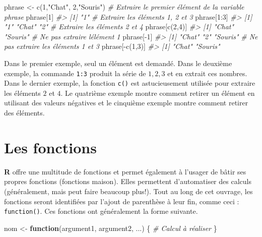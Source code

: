 \documentclass[
]{book}
\newenvironment{Shaded}{}{}
\newcommand{\CommentTok}[1]{\textit{#1}}
\newcommand{\ControlFlowTok}[1]{\textbf{#1}}
\newcommand{\DecValTok}[1]{#1}
\newcommand{\FunctionTok}[1]{#1}
\newcommand{\NormalTok}[1]{#1}
\newcommand{\OtherTok}[1]{#1}
\newcommand{\SpecialCharTok}[1]{#1}
\newcommand{\StringTok}[1]{#1}
\begin{document}
\begin{Shaded}
\begin{Highlighting}[]
\NormalTok{phrase }\OtherTok{\textless{}{-}} \FunctionTok{c}\NormalTok{(}\DecValTok{1}\NormalTok{,}\StringTok{"Chat"}\NormalTok{, }\DecValTok{2}\NormalTok{,}\StringTok{"Souris"}\NormalTok{)}
\CommentTok{\# Extraire le premier élément de la variable phrase}
\NormalTok{phrase[}\DecValTok{1}\NormalTok{]}
\CommentTok{\#\textgreater{} [1] "1"}
\CommentTok{\# Extraire les éléments 1, 2 et 3}
\NormalTok{phrase[}\DecValTok{1}\SpecialCharTok{:}\DecValTok{3}\NormalTok{]}
\CommentTok{\#\textgreater{} [1] "1"    "Chat" "2"}
\CommentTok{\# Extraire les éléments 2 et 4}
\NormalTok{phrase[}\FunctionTok{c}\NormalTok{(}\DecValTok{2}\NormalTok{,}\DecValTok{4}\NormalTok{)]}
\CommentTok{\#\textgreater{} [1] "Chat"   "Souris"}
\CommentTok{\# Ne pas extraire l\textquotesingle{}élément 1}
\NormalTok{phrase[}\SpecialCharTok{{-}}\DecValTok{1}\NormalTok{]}
\CommentTok{\#\textgreater{} [1] "Chat"   "2"      "Souris"}
\CommentTok{\# Ne pas extraire les éléments 1 et 3}
\NormalTok{phrase[}\SpecialCharTok{{-}}\FunctionTok{c}\NormalTok{(}\DecValTok{1}\NormalTok{,}\DecValTok{3}\NormalTok{)]}
\CommentTok{\#\textgreater{} [1] "Chat"   "Souris"}
\end{Highlighting}
\end{Shaded}

Dans le premier exemple, seul un élément est demandé. Dans le deuxième exemple, la commande \texttt{1:3} produit la série de \(1,2,3\) et en extrait ces nombres. Dans le dernier exemple, la fonction \texttt{c()} est astucieusement utilisée pour extraire les éléments \(2\) et \(4\). Le quatrième exemple montre comment retirer un élément en utilisant des valeurs négatives et le cinquième exemple montre comment retirer des éléments.

\hypertarget{les-fonctions}{%
\section{Les fonctions}\label{les-fonctions}}

\textbf{R} offre une multitude de fonctions et permet également à l'usager de bâtir ses propres fonctions (fonctions maison). Elles permettent d'automatiser des calculs (généralement, mais peut faire beaucoup plus!). Tout au long de cet ouvrage, les fonctions seront identifiées par l'ajout de parenthèse à leur fin, comme ceci : \texttt{function()}. Ces fonctions ont généralement la forme suivante.

\begin{Shaded}
\begin{Highlighting}[]
\NormalTok{nom }\OtherTok{\textless{}{-}} \ControlFlowTok{function}\NormalTok{(argument1, argument2, ...) \{}
  \CommentTok{\# Calcul à réaliser}
\NormalTok{\}}
\end{Highlighting}
\end{Shaded}
\end{document}
